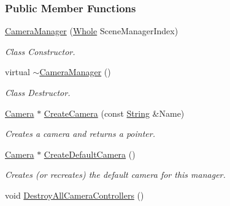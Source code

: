 \subsubsection*{Public Member Functions}
\begin{DoxyCompactItemize}
\item 
\hyperlink{classMezzanine_1_1CameraManager_a2beb54ad16ce87e9febc941818384b8e}{CameraManager} (\hyperlink{namespaceMezzanine_adcbb6ce6d1eb4379d109e51171e2e493}{Whole} SceneManagerIndex)
\begin{DoxyCompactList}\small\item\em Class Constructor. \item\end{DoxyCompactList}\item 
virtual \hyperlink{classMezzanine_1_1CameraManager_a1aad56c3d298c86bde95c26ce231697f}{$\sim$CameraManager} ()
\begin{DoxyCompactList}\small\item\em Class Destructor. \item\end{DoxyCompactList}\item 
\hyperlink{classMezzanine_1_1Camera}{Camera} $\ast$ \hyperlink{classMezzanine_1_1CameraManager_a4e97870f483d294683c508c04b41ac9c}{CreateCamera} (const \hyperlink{namespaceMezzanine_acf9fcc130e6ebf08e3d8491aebcf1c86}{String} \&Name)
\begin{DoxyCompactList}\small\item\em Creates a camera and returns a pointer. \item\end{DoxyCompactList}\item 
\hyperlink{classMezzanine_1_1Camera}{Camera} $\ast$ \hyperlink{classMezzanine_1_1CameraManager_a59b4343ed87c095cca6cb529d27babcc}{CreateDefaultCamera} ()
\begin{DoxyCompactList}\small\item\em Creates (or recreates) the default camera for this manager. \item\end{DoxyCompactList}\item 
\hypertarget{classMezzanine_1_1CameraManager_a1e0ef1d314efc126b8149ec713d0a27e}{
void \hyperlink{classMezzanine_1_1CameraManager_a1e0ef1d314efc126b8149ec713d0a27e}{DestroyAllCameraControllers} ()}
\label{classMezzanine_1_1CameraManager_a1e0ef1d314efc126b8149ec713d0a27e}


\end{DoxyCompactItemize}
